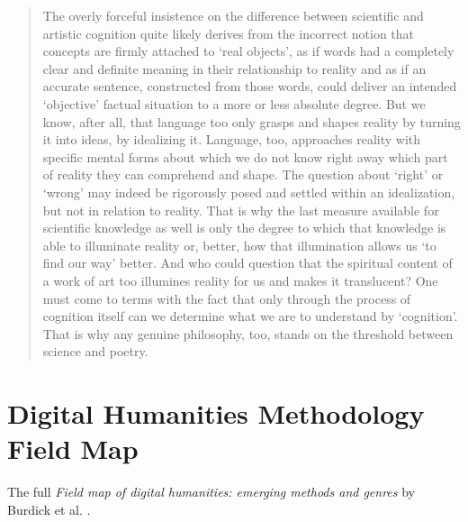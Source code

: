 \begin{quotation}
  The overly forceful insistence on the difference between scientific and artistic cognition quite likely derives from the incorrect notion that concepts are firmly attached to `real objects', as if words had a completely clear and definite meaning in their relationship to reality and as if an accurate sentence, constructed from those words, could deliver an intended `objective' factual situation to a more or less absolute degree. But we know, after all, that language too only grasps and shapes reality by turning it into ideas, by idealizing it. Language, too, approaches reality with specific mental forms about which we do not know right away which part of reality they can comprehend and shape. The question about `right' or `wrong' may indeed be rigorously posed and settled within an idealization, but not in relation to reality. That is why the last measure available for scientific knowledge as well is only the degree to which that knowledge is able to illuminate reality or, better, how that illumination allows us `to find our way' better. And who could question that the spiritual content of a work of art too illumines reality for us and makes it translucent? One must come to terms with the fact that only through the process of cognition itself can we determine what we are to understand by `cognition'. That is why any genuine philosophy, too, stands on the threshold between science and poetry. 
\end{quotation}


\section{Digital Humanities Methodology Field Map}
\label{s:dhmap}

The full \textit{Field map of digital humanities: emerging methods and genres} by Burdick et al. \autocite*{Burdick2012}.


